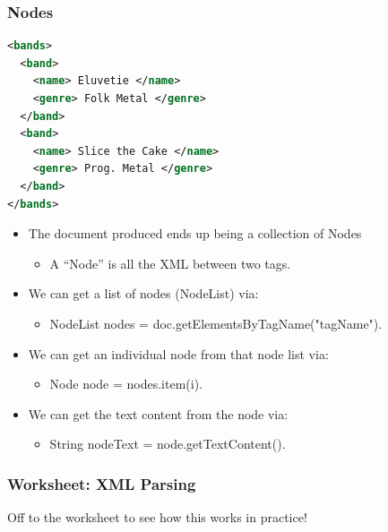 \documentclass{beamer}
\begin{document}
\begin{frame}[fragile]
    \frametitle{Nodes}
    \begin{minipage}{0.35\textwidth}
        \begin{lstlisting}[basicstyle=\tiny, language=XML]
<bands>
  <band>
    <name> Eluvetie </name>
    <genre> Folk Metal </genre>
  </band>
  <band>
    <name> Slice the Cake </name>
    <genre> Prog. Metal </genre>
  </band>
</bands>
        \end{lstlisting}
    \end{minipage}
    \begin{minipage}{0.64\textwidth}
        \begin{itemize}
            \item The document produced ends up being a collection of Nodes
            \begin{itemize}
                \tiny
                \item A ``Node'' is all the XML between two tags.
            \end{itemize}
            \item We can get a list of nodes (NodeList) via: 
            \begin{itemize}
                \tiny
                \item NodeList nodes = doc.getElementsByTagName("tagName").
            \end{itemize}
            \item We can get an individual node from that node list via:
            \begin{itemize}
                \tiny
                \item Node node = nodes.item(i).
            \end{itemize}
            \item We can get the text content from the node via: 
            \begin{itemize}
                \tiny
                \item String nodeText = node.getTextContent().
            \end{itemize}
        \end{itemize}
    \end{minipage}
\end{frame}

\begin{frame}[fragile]
    \frametitle{Worksheet: XML Parsing}
    Off to the worksheet to see how this works in practice!
\end{frame}
\end{document}
